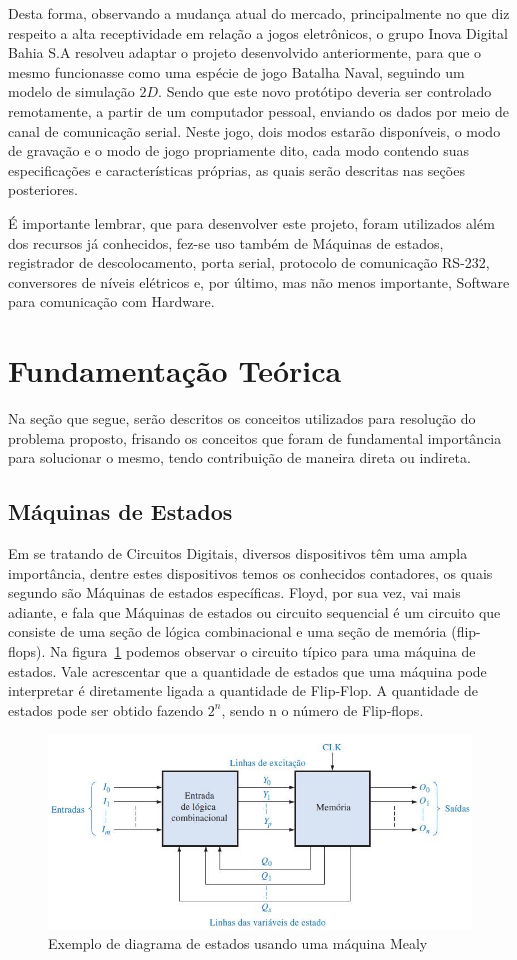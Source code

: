 \documentclass[12pt]{article}
\begin{document}
Desta forma, observando a mudança atual do mercado, principalmente no que diz respeito a alta receptividade em relação a jogos eletrônicos, o grupo Inova Digital Bahia S.A  resolveu adaptar o projeto desenvolvido anteriormente, para que o mesmo funcionasse como uma espécie de jogo Batalha Naval, seguindo um modelo de simulação $2D$. Sendo que este novo protótipo deveria ser controlado remotamente, a partir de um computador pessoal, enviando os dados por meio de canal de comunicação serial. Neste jogo, dois modos estarão disponíveis, o modo de gravação e o modo de jogo propriamente dito, cada modo contendo suas especificações e características próprias, as quais serão descritas nas seções posteriores.

É importante lembrar, que para desenvolver este projeto, foram utilizados além dos recursos já conhecidos, fez-se uso também de Máquinas de estados, registrador de descolocamento, porta serial, protocolo de comunicação RS-232, conversores de níveis elétricos e, por último, mas não menos importante, Software para comunicação com Hardware.

\section{Fundamentação Teórica}
Na seção que segue, serão descritos os conceitos utilizados para resolução do problema proposto, frisando os conceitos que foram de fundamental importância para solucionar o mesmo, tendo contribuição de maneira direta ou indireta.

\subsection{Máquinas de Estados}
Em se tratando de Circuitos Digitais, diversos dispositivos têm uma ampla importância, dentre estes dispositivos temos os conhecidos contadores, os quais segundo\cite{tocci1997digital} são Máquinas de estados específicas. Floyd, por sua vez, vai mais adiante, e fala que Máquinas de estados ou circuito sequencial é um circuito que  consiste de uma seção de lógica combinacional e uma seção de memória (flip-flops)\cite{floyd2011digital}. Na figura~\ref{fig:estados} podemos observar o circuito típico para uma máquina de estados. Vale acrescentar que a quantidade de estados que uma máquina pode interpretar é diretamente ligada a quantidade de Flip-Flop. A quantidade de estados pode ser obtido fazendo $2^{n}$, sendo n o número de Flip-flops.  

\begin{figure}[h]
\centering
\includegraphics[width=.8\textwidth]{img/estados.jpg}
\caption{Exemplo de diagrama de estados usando uma máquina Mealy}
\label{fig:estados}
\end{figure}
\end{document}
